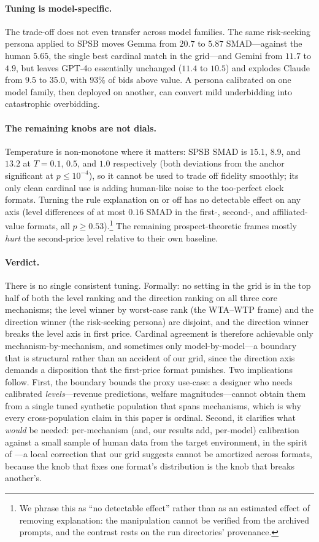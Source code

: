 \paragraph{Tuning is model-specific.} The trade-off does not even transfer across model families. The same risk-seeking persona applied to SPSB moves Gemma from $20.7$ to $5.87$ SMAD---against the human $5.65$, the single best cardinal match in the grid---and Gemini from $11.7$ to $4.9$, but leaves GPT-4o essentially unchanged ($11.4$ to $10.5$) and explodes Claude from $9.5$ to $35.0$, with $93\%$ of bids above value. A persona calibrated on one model family, then deployed on another, can convert mild underbidding into catastrophic overbidding.

\paragraph{The remaining knobs are not dials.} Temperature is non-monotone where it matters: SPSB SMAD is $15.1$, $8.9$, and $13.2$ at $T=0.1$, $0.5$, and $1.0$ respectively (both deviations from the anchor significant at $p\le10^{-4}$), so it cannot be used to trade off fidelity smoothly; its only clean cardinal use is adding human-like noise to the too-perfect clock formats. Turning the rule explanation on or off has no detectable effect on any axis (level differences of at most $0.16$ SMAD in the first-, second-, and affiliated-value formats, all $p\ge0.53$).\footnote{We phrase this as ``no detectable effect'' rather than as an estimated effect of removing explanation: the manipulation cannot be verified from the archived prompts, and the contrast rests on the run directories' provenance.} The remaining prospect-theoretic frames mostly \emph{hurt} the second-price level relative to their own baseline.

\paragraph{Verdict.} There is no single consistent tuning. Formally: no setting in the grid is in the top half of both the level ranking and the direction ranking on all three core mechanisms; the level winner by worst-case rank (the WTA--WTP frame) and the direction winner (the risk-seeking persona) are disjoint, and the direction winner breaks the level axis in first price. Cardinal agreement is therefore achievable only mechanism-by-mechanism, and sometimes only model-by-model---a boundary that is structural rather than an accident of our grid, since the direction axis demands a disposition that the first-price format punishes. Two implications follow. First, the boundary bounds the proxy use-case: a designer who needs calibrated \emph{levels}---revenue predictions, welfare magnitudes---cannot obtain them from a single tuned synthetic population that spans mechanisms, which is why every cross-population claim in this paper is ordinal. Second, it clarifies what \emph{would} be needed: per-mechanism (and, our results add, per-model) calibration against a small sample of human data from the target environment, in the spirit of \citet{corrigan2025usefulness}---a local correction that our grid suggests cannot be amortized across formats, because the knob that fixes one format's distribution is the knob that breaks another's.
